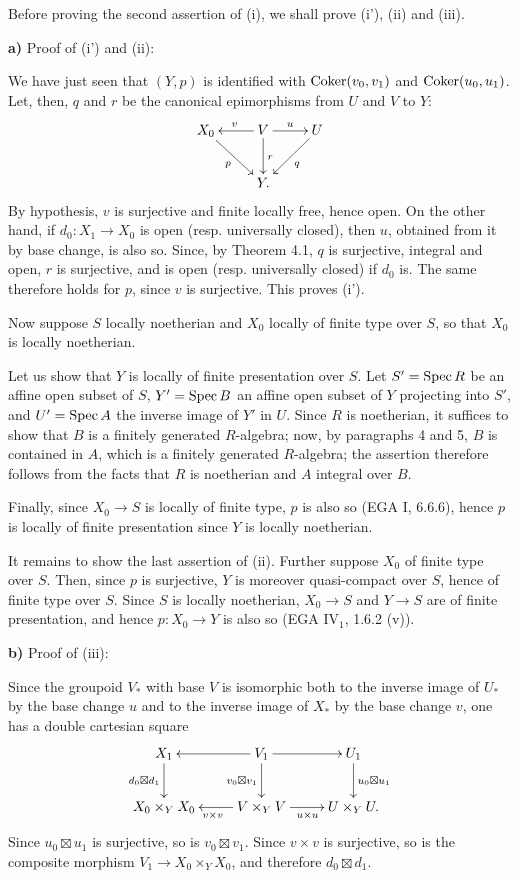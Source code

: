 Before proving the second assertion of (i), we shall prove (i'), (ii) and (iii).

\textbf{a)} Proof of (i') and (ii):

We have just seen that $(Y,p)$ is identified with $\operatorname{Coker}(v_0,v_1)$ and $\operatorname{Coker}(u_0,u_1)$. Let, then, $q$ and $r$ be the canonical epimorphisms from $U$ and $V$ to $Y$:
\[
\xymatrix{X_0\ar[dr]_p&V\ar[l]_v\ar[r]^u\ar[d]^r&U\ar[dl]^q\\&Y.&}
\]
By hypothesis, $v$ is surjective and finite locally free, hence open. On the other hand, if $d_0:X_1\to X_0$ is open (resp. universally closed), then $u$, obtained from it by base change, is also so. Since, by Theorem 4.1, $q$ is surjective, integral and open, $r$ is surjective, and is open (resp. universally closed) if $d_0$ is. The same therefore holds for $p$, since $v$ is surjective. This proves (i').

Now suppose $S$ locally noetherian and $X_0$ locally of finite type over $S$, so that $X_0$ is locally noetherian.

Let us show that $Y$ is locally of finite presentation over $S$. Let $S'=\operatorname{Spec} R$ be an affine open subset of $S$, $Y'=\operatorname{Spec} B$ an affine open subset of $Y$ projecting into $S'$, and $U'=\operatorname{Spec} A$ the inverse image of $Y'$ in $U$. Since $R$ is noetherian, it suffices to show that $B$ is a finitely generated $R$-algebra; now, by paragraphs 4 and 5, $B$ is contained in $A$, which is a finitely generated $R$-algebra; the assertion therefore follows from the facts that $R$ is noetherian and $A$ integral over $B$.

Finally, since $X_0\to S$ is locally of finite type, $p$ is also so (EGA I, 6.6.6), hence $p$ is locally of finite presentation since $Y$ is locally noetherian.

It remains to show the last assertion of (ii). Further suppose $X_0$ of finite type over $S$. Then, since $p$ is surjective, $Y$ is moreover quasi-compact over $S$, hence of finite type over $S$. Since $S$ is locally noetherian, $X_0\to S$ and $Y\to S$ are of finite presentation, and hence $p:X_0\to Y$ is also so (EGA IV$_1$, 1.6.2 (v)).

\textbf{b)} Proof of (iii):

Since the groupoid $V_*$ with base $V$ is isomorphic both to the inverse image of $U_*$ by the base change $u$ and to the inverse image of $X_*$ by the base change $v$, one has a double cartesian square
\[
\xymatrix{X_1\ar[d]_{d_0\boxtimes d_1}&V_1\ar[l]\ar[r]\ar[d]_{v_0\boxtimes v_1}&U_1\ar[d]^{u_0\boxtimes u_1}\\X_0\times_YX_0&V\times_YV\ar[l]^{v\times v}\ar[r]_{u\times u}&U\times_YU.}
\]
Since $u_0\boxtimes u_1$ is surjective, so is $v_0\boxtimes v_1$. Since $v\times v$ is surjective, so is the composite morphism $V_1\to X_0\times_YX_0$, and therefore $d_0\boxtimes d_1$.


